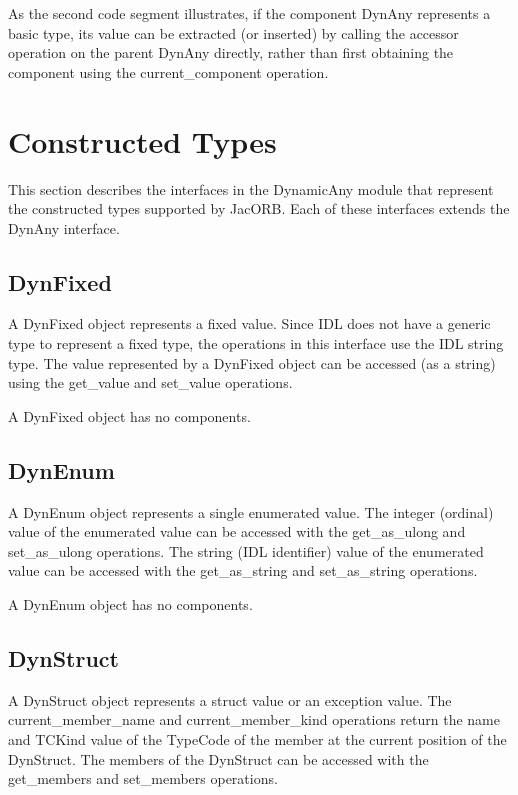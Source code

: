 \documentclass[12pt]{scrbook}
\begin{document}
As the second code segment illustrates, if the component DynAny
represents a basic type, its value can be extracted (or inserted) by
calling the accessor operation on the parent DynAny directly, rather
than first obtaining the component using the current\_component
operation.

\section{Constructed Types}

This section describes the interfaces in the DynamicAny module that
represent the constructed types supported by JacORB.  Each of these
interfaces extends the DynAny interface.



\subsection{DynFixed}

A DynFixed object represents a fixed value.  Since IDL does not have
a generic type to represent a fixed type, the operations in this
interface use the IDL string type.  The value represented by a
DynFixed object can be accessed (as a string) using the get\_value
and set\_value operations.

A DynFixed object has no components.

\subsection{DynEnum}

A DynEnum object represents a single enumerated value.  The integer
(ordinal) value of the enumerated value can be accessed with the
get\_as\_ulong and set\_as\_ulong operations.  The string (IDL
identifier) value of the enumerated value can be accessed with the
get\_as\_string and set\_as\_string operations.

A DynEnum object has no components.

\subsection{DynStruct}

A DynStruct object represents a struct value or an exception value.
The current\_member\_name and current\_member\_kind operations return
the name and TCKind value of the TypeCode of the member at the
current position of the DynStruct.  The members of the DynStruct can
be accessed with the get\_members and set\_members operations.
\end{document}
